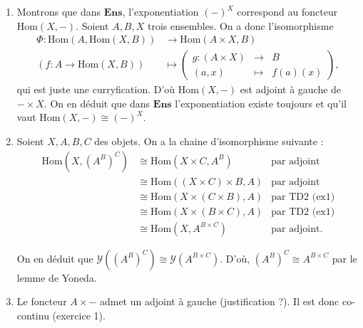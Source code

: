 \documentclass{../../td}
\begin{document}
  \begin{enumerate}
    \item Montrons que dans $\mathbf{Ens}$, l'exponentiation $(-)^X$ correspond au foncteur $\mathrm{Hom}(X, -)$.
      Soient $A,B,X$ trois ensembles.
      On a donc l'isomorphisme
      \begin{align*}
        \Phi: \mathrm{Hom}(A, \mathrm{Hom}(X, B)) &\longrightarrow \mathrm{Hom}(A \times X, B) \\
        (f : A \to \mathrm{Hom}(X, B)) &\longmapsto \left(
        \begin{array}{rcl}
          g : (A \times X) & \to & B\\
          (a,x) &\mapsto & f(a)(x)
        \end{array}
        \right)
      ,\end{align*}
      qui est juste une curryfication.
      D'où $\mathrm{Hom}(X, -)$ est adjoint à gauche de $- \times X$.
      On en déduit que dans $\mathbf{Ens}$ l'exponentiation existe toujours et qu'il vaut $\mathrm{Hom}(X, -) \cong (-)^X$.
    \item Soient $X,A,B,C$ des objets.
      On a la chaine d'isomorphisme suivante :
      \begin{align*}
        \mathrm{Hom}(X, (A^B)^C) &\cong \mathrm{Hom}(X \times C, A^B) & \text{par adjoint}\\
        &\cong \mathrm{Hom}((X \times C) \times B, A) & \text{par adjoint}\\
        &\cong \mathrm{Hom}(X \times (C \times B), A) & \text{par TD2 (ex1)}\\
        &\cong \mathrm{Hom}(X \times (B \times C), A) & \text{par TD2 (ex1)}\\
        &\cong \mathrm{Hom}(X, A^{B \times C}) & \text{par adjoint}
      .\end{align*}

      On en déduit que $\mathcal{Y}((A^{B})^{C}) \cong \mathcal{Y}(A^{B \times C})$.
      D'où, $(A^B)^C \cong A^{B \times C}$ par le lemme de Yoneda.
    \item Le foncteur $A \times -$ admet un adjoint à gauche (justification ?).
      Il est donc co-continu (exercice 1).


\end{enumerate}
\end{document}

